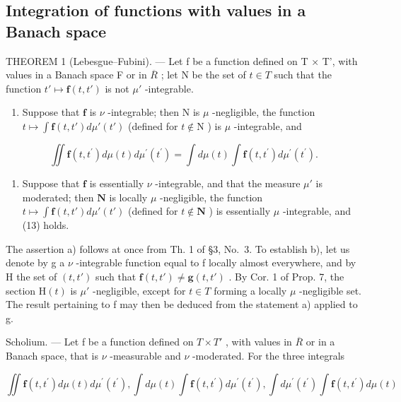 \subsection{Integration of functions with values in a Banach space}

THEOREM 1 (Lebesgue--Fubini). --- Let f be a function defined on T × T', with values in a Banach space F or in \(\overline{R}\) ; let N be the set of \(t \in T\) such that the function \(t' \mapsto \mathbf{f}(t, t')\) is not \(\mu'\) -integrable.

\begin{enumerate}
\def\labelenumi{\alph{enumi})}
\tightlist
\item
  Suppose that \(\mathbf{f}\) is \(\nu\) -integrable; then \(\mathrm{N}\) is \(\mu\) -negligible, the function \(t \mapsto \int \mathbf{f}(t, t') d\mu'(t')\) (defined for \(t \notin \mathrm{N}\) ) is \(\mu\) -integrable, and
\end{enumerate}

\[
\iint \mathbf {f} (t, t ^ {\prime}) d \mu (t) d \mu^ {\prime} (t ^ {\prime}) = \int d \mu (t) \int \mathbf {f} (t, t ^ {\prime}) d \mu^ {\prime} (t ^ {\prime}).\tag{13}
\]

\begin{enumerate}
\def\labelenumi{\alph{enumi})}
\setcounter{enumi}{1}
\tightlist
\item
  Suppose that \(\mathbf{f}\) is essentially \(\nu\) -integrable, and that the measure \(\mu'\) is moderated; then \(\mathbf{N}\) is locally \(\mu\) -negligible, the function \(t \mapsto \int \mathbf{f}(t, t') d\mu'(t')\) (defined for \(t \notin \mathbf{N}\) ) is essentially \(\mu\) -integrable, and (13) holds.
\end{enumerate}

The assertion a) follows at once from Th. 1 of §3, No.~3. To establish b), let us denote by g a \(\nu\) -integrable function equal to f locally almost everywhere, and by H the set of \((t, t')\) such that \(\mathbf{f}(t, t') \neq \mathbf{g}(t, t')\) . By Cor. 1 of Prop. 7, the section \(\mathrm{H}(t)\) is \(\mu'\) -negligible, except for \(t \in T\) forming a locally \(\mu\) -negligible set. The result pertaining to f may then be deduced from the statement a) applied to g.

Scholium. --- Let f be a function defined on \(T \times T'\) , with values in \(\overline{R}\) or in a Banach space, that is \(\nu\) -measurable and \(\nu\) -moderated. For the three integrals

\[
\iint \mathbf {f} (t, t ^ {\prime}) d \mu (t) d \mu^ {\prime} (t ^ {\prime}), \int d \mu (t) \int \mathbf {f} (t, t ^ {\prime}) d \mu^ {\prime} (t ^ {\prime}), \int d \mu^ {\prime} (t ^ {\prime}) \int \mathbf {f} (t, t ^ {\prime}) d \mu (t)
\]

